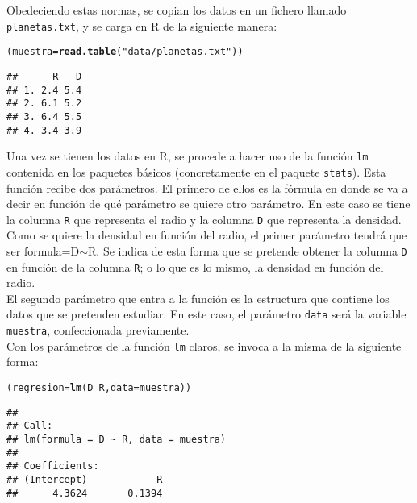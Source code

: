 \documentclass[12pt]{report}\usepackage[]{graphicx}\usepackage[dvipsnames]{xcolor}
\makeatletter
\newcommand{\hlstr}[1]{\textcolor[rgb]{0.192,0.494,0.8}{#1}}%
\newcommand{\hlopt}[1]{\textcolor[rgb]{0,0,0}{#1}}%
\newcommand{\hlstd}[1]{\textcolor[rgb]{0.345,0.345,0.345}{#1}}%
\newcommand{\hlkwb}[1]{\textcolor[rgb]{0.69,0.353,0.396}{#1}}%
\newcommand{\hlkwc}[1]{\textcolor[rgb]{0.333,0.667,0.333}{#1}}%
\newcommand{\hlkwd}[1]{\textcolor[rgb]{0.737,0.353,0.396}{\textbf{#1}}}%
\newenvironment{kframe}{%
 \def\at@end@of@kframe{}%
 \ifinner\ifhmode%
  \def\at@end@of@kframe{\end{minipage}}%
  \begin{minipage}{\columnwidth}%
 \fi\fi%
 \def\FrameCommand##1{\hskip\@totalleftmargin \hskip-\fboxsep
 \colorbox{shadecolor}{##1}\hskip-\fboxsep
     \hskip-\linewidth \hskip-\@totalleftmargin \hskip\columnwidth}%
 \MakeFramed {\advance\hsize-\width
   \@totalleftmargin\z@ \linewidth\hsize
   \@setminipage}}%
 {\par\unskip\endMakeFramed%
 \at@end@of@kframe}
\newenvironment{knitrout}{}{} %
\makeatother
\begin{document}
	Obedeciendo estas normas, se copian los datos en un fichero llamado \texttt{planetas.txt}, y se carga en R de la siguiente manera:
	
\begin{knitrout}
\color{fgcolor}\begin{kframe}
\begin{alltt}
\hlstd{(muestra} \hlkwb{=} \hlkwd{read.table}\hlstd{(}\hlstr{"data/planetas.txt"}\hlstd{))}
\end{alltt}
\begin{verbatim}
##      R   D
## 1. 2.4 5.4
## 2. 6.1 5.2
## 3. 6.4 5.5
## 4. 3.4 3.9
\end{verbatim}
\end{kframe}
\end{knitrout}
	
	Una vez se tienen los datos en R, se procede a hacer uso de la función \texttt{lm} contenida en los paquetes básicos (concretamente en el paquete \texttt{stats}). Esta función recibe dos parámetros. El primero de ellos es la fórmula en donde se va a decir en función de qué parámetro se quiere otro parámetro. En este caso se tiene la columna \texttt{R} que representa el radio y la columna \texttt{D} que representa la densidad. Como se quiere la densidad en función del radio, el primer parámetro tendrá que ser formula=D$\sim$R. Se indica de esta forma que se pretende obtener la columna \texttt{D} en función de la columna \texttt{R}; o lo que es lo mismo, la densidad en función del radio.\\
	
	El segundo parámetro que entra a la función es la estructura que contiene los datos que se pretenden estudiar. En este caso, el parámetro \texttt{data} será la variable \texttt{muestra}, confeccionada previamente.\\
	
	Con los parámetros de la función \texttt{lm} claros, se invoca a la misma de la siguiente forma:
	
\begin{knitrout}
\color{fgcolor}\begin{kframe}
\begin{alltt}
\hlstd{(regresion}\hlkwb{=}\hlkwd{lm}\hlstd{(D}\hlopt{~}\hlstd{R,} \hlkwc{data}\hlstd{=muestra))}
\end{alltt}
\begin{verbatim}
## 
## Call:
## lm(formula = D ~ R, data = muestra)
## 
## Coefficients:
## (Intercept)            R  
##      4.3624       0.1394
\end{verbatim}
\end{kframe}
\end{knitrout}
	
\end{document}
